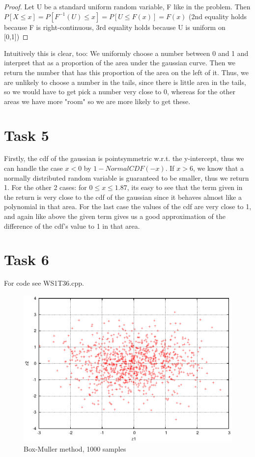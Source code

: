 \documentclass[]{article}
\begin{document}
\begin{proof}
Let U be a standard uniform random variable, F like in the problem. Then
$P\left[X\le x\right]=P\left[F^{-1}(U) \le x\right]=P\left[U \le
F(x)\right]=F(x)$ (2nd equality holds because F is right-continuous, 3rd
equality holds because U is uniform on [0,1])
\end{proof}

Intuitively this is clear, too: We uniformly choose a number between 0 and 1 and
interpret that as a proportion of the area under the gaussian curve. Then we
return the number that has this proportion of the area on the left of it. Thus,
we are unlikely to choose a number in the tails, since there is little area in
the tails, so we would have to get pick a number very close to 0, whereas for
the other areas we have more "room" so we are more likely to get these.

\section*{Task 5} Firstly, the cdf of the gaussian is pointsymmetric w.r.t. the
y-intercept, thus we can handle the case $x<0$ by $1-NormalCDF(-x)$. If $x>6$,
we know that a normally distributed random variable is guaranteed to be smaller,
thus we return 1. For the other 2 cases: for $0\le x\le 1.87$, its easy to see
that the term given in the return is very close to the cdf of the gaussian since
it behaves almost like a polynomial in that area. For the last case the values
of the cdf are very close to 1, and again like above the given term gives us a
good approximation of the difference of the cdf's value to 1 in that area.

\section*{Task 6} For code see WS1T36.cpp.
\begin{figure}[!ht]
\includegraphics{task6}
\caption{Box-Muller method, 1000 samples}
\label{fig:Task6}
\end{figure}
\clearpage
\end{document}

